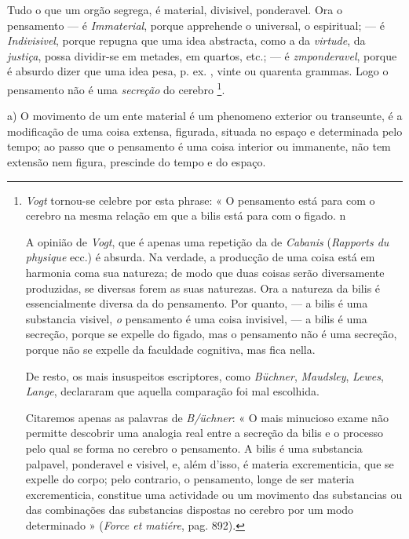Tudo o que um orgão segrega, é material, divisivel, ponderavel. Ora o pensamento --- é \emph{Immaterial}, porque apprehende o universal, o espiritual; --- é \emph{Indivisivel}, porque repugna que uma idea abstracta, como a da \emph{virtude}, da \emph{justiça}, possa dividir-se em metades, em quartos, etc.; --- é \emph{zmponderavel}, porque é absurdo   dizer que uma idea pesa, p. ex. , vinte ou quarenta grammas. Logo o pensamento não é uma \emph{secreção} do cerebro \footnote{\emph{Vogt} tornou-se celebre por esta phrase: « O pensamento está para com o cerebro na mesma relação em que a bilis está para com o figado. n\par A opinião de \emph{Vogt}, que é apenas uma repetição da de \emph{Cabanis} (\emph{Rapports du physique} ecc.) é absurda. Na verdade, a producção de uma coisa está em harmonia coma sua natureza; de modo que duas coisas serão diversamente produzidas, se diversas forem as suas naturezas. Ora a natureza da bilis é essencialmente diversa da do pensamento. Por quanto, --- a bilis é uma substancia visivel, \emph{o} pensamento é uma coisa invisivel, --- a bilis é uma secreção, porque se expelle do figado, mas o pensamento não é uma secreção, porque não se expelle da faculdade cognitiva, mas fica nella.\par De resto, os mais insuspeitos escriptores, como \emph{Büchner}, \emph{Maudsley}, \emph{Lewes}, \emph{Lange}, declararam que aquella comparação foi mal escolhida.\par Citaremos apenas as palavras de \emph{B/üchner}: « O mais minucioso exame não permitte descobrir uma analogia real entre a secreção da bilis e o processo pelo qual se forma no cerebro o pensamento. A bilis é uma substancia palpavel, ponderavel e visivel, e, além d'isso, é materia excrementicia, que se expelle do corpo; pelo contrario, o pensamento, longe de ser materia excrementicia, constitue uma actividade ou um movimento das substancias ou das combinações das substancias dispostas no cerebro por um modo determinado » (\emph{Force et matiére}, pag. 892).}.



a) O movimento de um ente material é um phenomeno exterior ou transeunte, é a modificação de uma coisa extensa, figurada, situada no espaço e determinada pelo tempo; ao passo que o pensamento é uma coisa interior ou immanente, não tem extensão nem figura, prescinde do tempo e do espaço.

